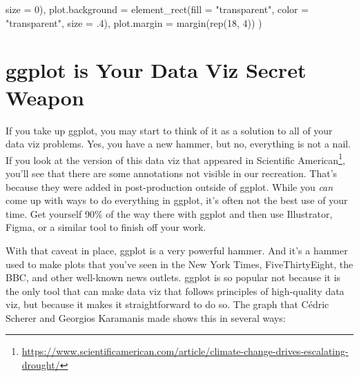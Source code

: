 \documentclass[
]{book}
\newenvironment{Shaded}{\begin{snugshade}}{\end{snugshade}}
\newcommand{\AttributeTok}[1]{\textcolor[rgb]{0.77,0.63,0.00}{#1}}
\newcommand{\DecValTok}[1]{\textcolor[rgb]{0.00,0.00,0.81}{#1}}
\newcommand{\FunctionTok}[1]{\textcolor[rgb]{0.00,0.00,0.00}{#1}}
\newcommand{\NormalTok}[1]{#1}
\newcommand{\StringTok}[1]{\textcolor[rgb]{0.31,0.60,0.02}{#1}}
\begin{document}
\begin{Shaded}
\begin{Highlighting}[]
                                \AttributeTok{size =} \DecValTok{0}\NormalTok{),}
    \AttributeTok{plot.background =} \FunctionTok{element\_rect}\NormalTok{(}\AttributeTok{fill =} \StringTok{"transparent"}\NormalTok{, }
                                   \AttributeTok{color =} \StringTok{"transparent"}\NormalTok{, }
                                   \AttributeTok{size =}\NormalTok{ .}\DecValTok{4}\NormalTok{),}
    \AttributeTok{plot.margin =} \FunctionTok{margin}\NormalTok{(}\FunctionTok{rep}\NormalTok{(}\DecValTok{18}\NormalTok{, }\DecValTok{4}\NormalTok{))}
\NormalTok{  )}
\end{Highlighting}
\end{Shaded}

\hypertarget{ggplot-is-your-data-viz-secret-weapon}{%
\section{ggplot is Your Data Viz Secret Weapon}\label{ggplot-is-your-data-viz-secret-weapon}}

If you take up ggplot, you may start to think of it as a solution to all of your data viz problems. Yes, you have a new hammer, but no, everything is not a nail. If you look at the version of this data viz that appeared in Scientific American\footnote{\url{https://www.scientificamerican.com/article/climate-change-drives-escalating-drought/}}, you'll see that there are some annotations not visible in our recreation. That's because they were added in post-production outside of ggplot. While you \emph{can} come up with ways to do everything in ggplot, it's often not the best use of your time. Get yourself 90\% of the way there with ggplot and then use Illustrator, Figma, or a similar tool to finish off your work.

With that caveat in place, ggplot is a very powerful hammer. And it's a hammer used to make plots that you've seen in the New York Times, FiveThirtyEight, the BBC, and other well-known news outlets. ggplot is so popular not because it is the only tool that can make data viz that follows principles of high-quality data viz, but because it makes it straightforward to do so. The graph that Cédric Scherer and Georgios Karamanis made shows this in several ways:
\end{document}
